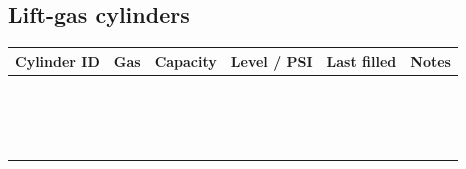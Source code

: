 \documentclass[11pt,openany]{report}
\begin{document}
\subsection*{Lift-gas cylinders}
{\renewcommand{\arraystretch}{2.6}\small
\begin{tabularx}{\textwidth}{|>{\raggedright\arraybackslash}p{2.4cm}|>{\raggedright\arraybackslash}p{1.6cm}|>{\raggedright\arraybackslash}p{2.0cm}|>{\raggedright\arraybackslash}p{2.1cm}|>{\raggedright\arraybackslash}p{2.3cm}|X|}
\hline
\rowcolor{tlorange!22}
\textbf{Cylinder ID} & \textbf{Gas} & \textbf{Capacity} & \textbf{Level / PSI} & \textbf{Last filled} & \textbf{Notes} \\ \hline
 & & & & & \\ \hline
 & & & & & \\ \hline
 & & & & & \\ \hline
 & & & & & \\ \hline
 & & & & & \\ \hline
 & & & & & \\ \hline
 & & & & & \\ \hline
 & & & & & \\ \hline
 & & & & & \\ \hline
 & & & & & \\ \hline
 & & & & & \\ \hline
 & & & & & \\ \hline
 & & & & & \\ \hline
 & & & & & \\ \hline
 & & & & & \\ \hline
 & & & & & \\ \hline
\end{tabularx}}
\end{document}

